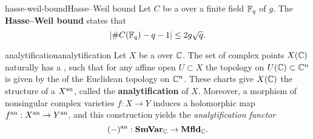 \begin{topic}{hasse-weil-bound}{Hasse--Weil bound}
    Let $C$ be a    over a finite field $\mathbb{F}_q$ of  $g$. The \textbf{Hasse--Weil bound} states that
    \[ | \#C(\mathbb{F}_q) - q - 1 | \le 2 g \sqrt{q} . \]
\end{topic}

\begin{topic}{analytification}{analytification}
    Let $X$ be a   over $\mathbb{C}$. 
    The set of complex points $X(\mathbb{C})$ naturally has a , such that for any affine open $U \subset X$ the topology on $U(\mathbb{C}) \subset \mathbb{C}^n$ is given by the  of the Euclidean topology on $\mathbb{C}^n$. These charts give $X(\mathbb{C})$ the structure of a  $X^\textup{an}$, called the \textbf{analytification} of $X$. Moreover, a morphism of nonsingular complex varieties $f : X \to Y$ induces a holomorphic map $f^\textup{an} : X^\textup{an} \to Y^\textup{an}$, and this construction yields the \textit{analytification functor}
    \[ (-)^\textup{an} : \textbf{SmVar}_{\mathbb{C}} \to \textbf{Mfld}_{\mathbb{C}} . \]
\end{topic}
